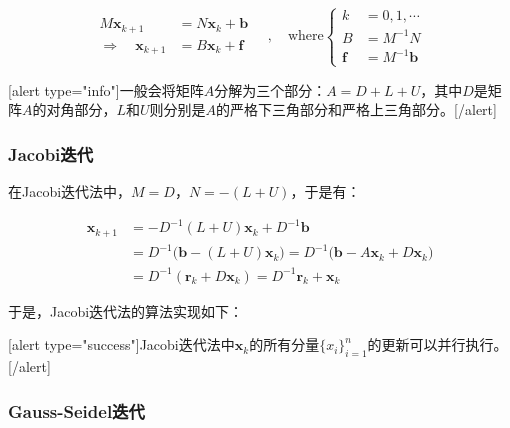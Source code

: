 \documentclass[UTF8,nofonts]{ctexart}
\begin{document}
\begin{equation*}
\begin{aligned}
M\boldsymbol{x}_{k+1}&=N\boldsymbol{x}_{k}+\boldsymbol{b}\\
\Longrightarrow\quad\boldsymbol{x}_{k+1}&=B\boldsymbol{x}_{k}+\boldsymbol{f}
\end{aligned}\quad,\quad\text{where}
\left\{\begin{aligned}k&=0,1,\cdots\\B&=M^{-1}N\\\boldsymbol{f}&=M^{-1}\boldsymbol{b}\end{aligned}\right.
\end{equation*}

[alert type="info"]一般会将矩阵$A$分解为三个部分：$A=D+L+U$，其中$D$是矩阵$A$的对角部分，$L$和$U$则分别是$A$的严格下三角部分和严格上三角部分。[/alert]

\subsubsection*{Jacobi迭代}

在Jacobi迭代法中，$M=D$，$N=-(L+U)$，于是有：

\begin{equation*}
\begin{aligned}
\boldsymbol{x}_{k+1}&=-D^{-1}(L+U)\boldsymbol{x}_k+D^{-1}\boldsymbol{b} \\
&=D^{-1}\big(\boldsymbol{b}-(L+U)\boldsymbol{x}_k\big)=D^{-1}\big(\boldsymbol{b}-A\boldsymbol{x}_k+D\boldsymbol{x}_k\big) \\
&=D^{-1}(\boldsymbol{r}_k+D\boldsymbol{x}_k)=D^{-1}\boldsymbol{r}_k+\boldsymbol{x}_k
\end{aligned}
\end{equation*}

于是，Jacobi迭代法的算法实现如下：

\begin{algorithm}[H]
\end{algorithm}

[alert type="success"]Jacobi迭代法中$\boldsymbol{x}_k$的所有分量$\{x_{i}\}_{i=1}^n$的更新可以并行执行。[/alert]

\subsubsection*{Gauss-Seidel迭代}
\end{document}
